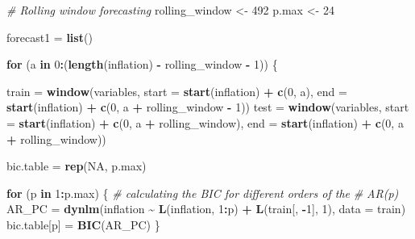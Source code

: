 \documentclass[
]{article}
\newenvironment{Shaded}{\begin{snugshade}}{\end{snugshade}}
\newcommand{\AttributeTok}[1]{\textcolor[rgb]{0.13,0.29,0.53}{#1}}
\newcommand{\CommentTok}[1]{\textcolor[rgb]{0.56,0.35,0.01}{\textit{#1}}}
\newcommand{\ConstantTok}[1]{\textcolor[rgb]{0.56,0.35,0.01}{#1}}
\newcommand{\ControlFlowTok}[1]{\textcolor[rgb]{0.13,0.29,0.53}{\textbf{#1}}}
\newcommand{\DecValTok}[1]{\textcolor[rgb]{0.00,0.00,0.81}{#1}}
\newcommand{\FunctionTok}[1]{\textcolor[rgb]{0.13,0.29,0.53}{\textbf{#1}}}
\newcommand{\NormalTok}[1]{#1}
\newcommand{\OtherTok}[1]{\textcolor[rgb]{0.56,0.35,0.01}{#1}}
\newcommand{\SpecialCharTok}[1]{\textcolor[rgb]{0.81,0.36,0.00}{\textbf{#1}}}
\begin{document}
\begin{Shaded}
\begin{Highlighting}[]
\CommentTok{\# Rolling window forecasting}
\NormalTok{rolling\_window }\OtherTok{\textless{}{-}} \DecValTok{492}
\NormalTok{p.max }\OtherTok{\textless{}{-}} \DecValTok{24}

\NormalTok{forecast1 }\OtherTok{=} \FunctionTok{list}\NormalTok{()}

\ControlFlowTok{for}\NormalTok{ (a }\ControlFlowTok{in} \DecValTok{0}\SpecialCharTok{:}\NormalTok{(}\FunctionTok{length}\NormalTok{(inflation) }\SpecialCharTok{{-}}\NormalTok{ rolling\_window }\SpecialCharTok{{-}} \DecValTok{1}\NormalTok{)) \{}

\NormalTok{    train }\OtherTok{=} \FunctionTok{window}\NormalTok{(variables, }\AttributeTok{start =} \FunctionTok{start}\NormalTok{(inflation) }\SpecialCharTok{+} \FunctionTok{c}\NormalTok{(}\DecValTok{0}\NormalTok{,}
\NormalTok{        a), }\AttributeTok{end =} \FunctionTok{start}\NormalTok{(inflation) }\SpecialCharTok{+} \FunctionTok{c}\NormalTok{(}\DecValTok{0}\NormalTok{, a }\SpecialCharTok{+}\NormalTok{ rolling\_window }\SpecialCharTok{{-}}
        \DecValTok{1}\NormalTok{))}
\NormalTok{    test }\OtherTok{=} \FunctionTok{window}\NormalTok{(variables, }\AttributeTok{start =} \FunctionTok{start}\NormalTok{(inflation) }\SpecialCharTok{+} \FunctionTok{c}\NormalTok{(}\DecValTok{0}\NormalTok{,}
\NormalTok{        a }\SpecialCharTok{+}\NormalTok{ rolling\_window), }\AttributeTok{end =} \FunctionTok{start}\NormalTok{(inflation) }\SpecialCharTok{+} \FunctionTok{c}\NormalTok{(}\DecValTok{0}\NormalTok{, a }\SpecialCharTok{+}
\NormalTok{        rolling\_window))}

\NormalTok{    bic.table }\OtherTok{=} \FunctionTok{rep}\NormalTok{(}\ConstantTok{NA}\NormalTok{, p.max)}

    \ControlFlowTok{for}\NormalTok{ (p }\ControlFlowTok{in} \DecValTok{1}\SpecialCharTok{:}\NormalTok{p.max) \{}
        \CommentTok{\# calculating the BIC for different orders of the}
        \CommentTok{\# AR(p)}
\NormalTok{        AR\_PC }\OtherTok{=} \FunctionTok{dynlm}\NormalTok{(inflation }\SpecialCharTok{\textasciitilde{}} \FunctionTok{L}\NormalTok{(inflation, }\DecValTok{1}\SpecialCharTok{:}\NormalTok{p) }\SpecialCharTok{+} \FunctionTok{L}\NormalTok{(train[,}
            \SpecialCharTok{{-}}\DecValTok{1}\NormalTok{], }\DecValTok{1}\NormalTok{), }\AttributeTok{data =}\NormalTok{ train)}
\NormalTok{        bic.table[p] }\OtherTok{=} \FunctionTok{BIC}\NormalTok{(AR\_PC)}
\NormalTok{    \}}


\end{Highlighting}
\end{Shaded}
\end{document}
